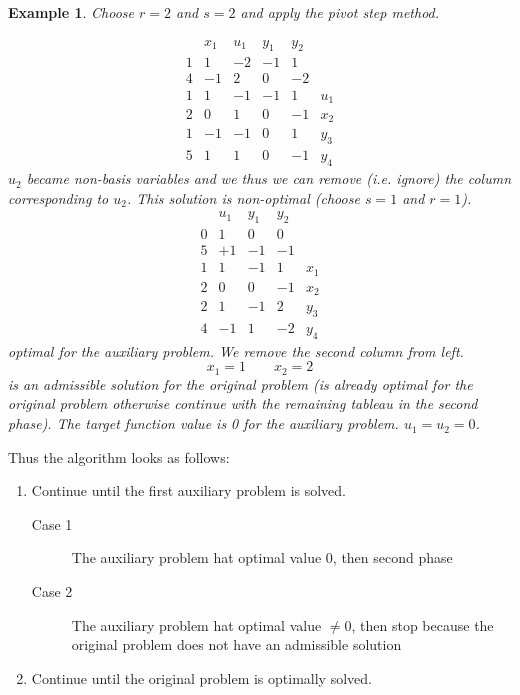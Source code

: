 \documentclass{article}
\numberwithin{lecref}{section}
\newtheorem*{Example}{Example}
\begin{document}
\begin{Example}
	Choose $r = 2$ and $s = 2$ and apply the pivot step method.

	\[
		\begin{array}{c|ccccr}
			  & x_1 & u_1 & y_1 & y_2 & \\
			1 & 1 & -2 & -1 & 1 & \\
			\hline
			4 & -1 & 2 & 0 & -2 & \\
			\hline
			1 & 1 & -1 & -1 & 1 & u_1 \\
			2 & 0 & 1 & 0 & -1 & x_2 \\
			1 & -1 & -1 & 0 & 1 & y_3 \\
			5 & 1 & 1 & 0 & -1 & y_4
		\end{array}
	\]
	$u_2$ became non-basis variables and we thus we can remove (i.e. ignore) the column corresponding to $u_2$. This solution is non-optimal (choose $s = 1$ and $r = 1$).
	\[
		\begin{array}{c|cccc}
			  & u_1 & y_1 & y_2 & \\
			0 & 1 & 0 & 0 & \\
			5 & +1 & -1 & -1 & \\
		\hline
			1 & 1 & -1 & 1 & x_1 \\
			2 & 0 & 0 & -1 & x_2 \\
			2 & 1 & -1 & 2 & y_3 \\
			4 & -1 & 1 & -2 & y_4
		\end{array}
	\]
	optimal for the auxiliary problem. We remove the second column from left.
	\[ x_1 = 1 \qquad x_2 = 2 \]
	is an admissible solution for the original problem
	(is already optimal for the original problem otherwise continue with the remaining tableau in the second phase).
	The target function value is 0 for the auxiliary problem. $u_1 = u_2 = 0$.
\end{Example}

Thus the algorithm looks as follows:
\begin{enumerate}
	\item Continue until the first auxiliary problem is solved.
		\begin{description}
			\item[Case 1] The auxiliary problem hat optimal value 0, then second phase
			\item[Case 2] The auxiliary problem hat optimal value $\neq 0$, then stop because the original problem does not have an admissible solution
		\end{description}
	\item Continue until the original problem is optimally solved.
\end{enumerate}
\end{document}
